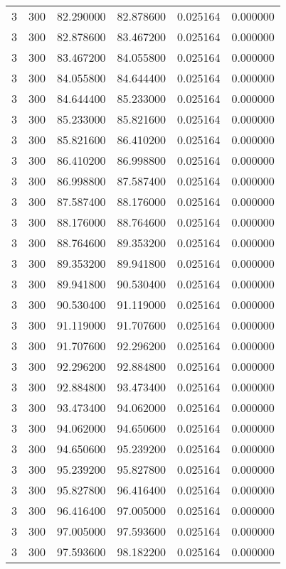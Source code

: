 \begin{longtable}{rrrrrr}
3 & 300 & 82.290000 & 82.878600 & 0.025164 & 0.000000 \\
3 & 300 & 82.878600 & 83.467200 & 0.025164 & 0.000000 \\
3 & 300 & 83.467200 & 84.055800 & 0.025164 & 0.000000 \\
3 & 300 & 84.055800 & 84.644400 & 0.025164 & 0.000000 \\
3 & 300 & 84.644400 & 85.233000 & 0.025164 & 0.000000 \\
3 & 300 & 85.233000 & 85.821600 & 0.025164 & 0.000000 \\
3 & 300 & 85.821600 & 86.410200 & 0.025164 & 0.000000 \\
3 & 300 & 86.410200 & 86.998800 & 0.025164 & 0.000000 \\
3 & 300 & 86.998800 & 87.587400 & 0.025164 & 0.000000 \\
3 & 300 & 87.587400 & 88.176000 & 0.025164 & 0.000000 \\
3 & 300 & 88.176000 & 88.764600 & 0.025164 & 0.000000 \\
3 & 300 & 88.764600 & 89.353200 & 0.025164 & 0.000000 \\
3 & 300 & 89.353200 & 89.941800 & 0.025164 & 0.000000 \\
3 & 300 & 89.941800 & 90.530400 & 0.025164 & 0.000000 \\
3 & 300 & 90.530400 & 91.119000 & 0.025164 & 0.000000 \\
3 & 300 & 91.119000 & 91.707600 & 0.025164 & 0.000000 \\
3 & 300 & 91.707600 & 92.296200 & 0.025164 & 0.000000 \\
3 & 300 & 92.296200 & 92.884800 & 0.025164 & 0.000000 \\
3 & 300 & 92.884800 & 93.473400 & 0.025164 & 0.000000 \\
3 & 300 & 93.473400 & 94.062000 & 0.025164 & 0.000000 \\
3 & 300 & 94.062000 & 94.650600 & 0.025164 & 0.000000 \\
3 & 300 & 94.650600 & 95.239200 & 0.025164 & 0.000000 \\
3 & 300 & 95.239200 & 95.827800 & 0.025164 & 0.000000 \\
3 & 300 & 95.827800 & 96.416400 & 0.025164 & 0.000000 \\
3 & 300 & 96.416400 & 97.005000 & 0.025164 & 0.000000 \\
3 & 300 & 97.005000 & 97.593600 & 0.025164 & 0.000000 \\
3 & 300 & 97.593600 & 98.182200 & 0.025164 & 0.000000 \\

\end{longtable}
